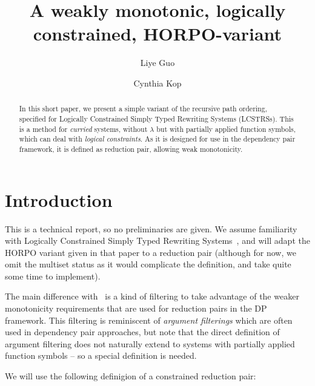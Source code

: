\documentclass[a4paper,USenglish,cleveref,autoref,thm-restate]{lipics-v2021}
\title{A weakly monotonic, logically constrained, HORPO-variant}
\author{Liye Guo}{Radboud University, Nijmegen, The Netherlands}{l.guo@cs.ru.nl}{https://orcid.org/0000-0002-3064-2691}{}
\author{Cynthia Kop}{Radboud University, Nijmegen, The Netherlands}{c.kop@cs.ru.nl}{https://orcid.org/0000-0002-6337-2544}{}
\begin{document}
\maketitle

\begin{abstract}
In this short paper, we present a simple variant of the recursive path ordering, specified for
Logically Constrained Simply Typed Rewriting Systems (LCSTRSs).  This is a method for
\emph{curried} systems, without $\lambda$ but with partially applied function symbols, which can
deal with \emph{logical constraints}.  As it is designed for use in the dependency pair framework,
it is defined as reduction pair, allowing weak monotonicity.
\end{abstract}

\section{Introduction}

This is a technical report, so no preliminaries are given.
We assume familiarity with Logically Constrained Simply Typed Rewriting Systems~\cite{guo:kop:24},
and will adapt the HORPO variant given in that paper to a reduction pair (although for now, we omit
the multiset status as it would complicate the definition, and take quite some time to implement).

The main difference with~\cite{guo:kop:24} is a kind of filtering to take advantage of the weaker
monotonicity requirements that are used for reduction pairs in the DP framework.  This filtering is
reminiscent of \emph{argument filterings} which are often used in dependency pair approaches, but
note that the direct definition of argument filtering does not naturally extend to systems with
partially applied function symbols -- so a special definition is needed.

We will use the following definigion of a constrained reduction pair:
\end{document}
